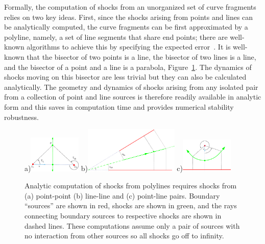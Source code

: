 Formally, the computation of shocks from an unorganized set of curve fragments relies on two key ideas. First, since the shocks arising from points and lines can be analytically computed, the curve fragments can be first approximated by a polyline, namely, a set of line segments that share end points; there are well-known algorithms to achieve this by specifying the expected error~\cite{vxl:webcite}. It is well-known that the bisector of two points is a line, the bisector of two lines is a line, and the bisector of a point and a line is a parabola, Figure~\ref{fig:bisect}. The dynamics of shocks moving on this bisector are less trivial but they can also be calculated analytically. The geometry and dynamics of shocks arising from any isolated pair from a collection of point and line sources is therefore readily available in analytic form and this saves in computation time and provides numerical stability robustness. 

\begin{figure}[ht]
\center
a)\includegraphics[width=0.221\textwidth]{figs/point-point-fixed.pdf}
b)\includegraphics[width=0.4\textwidth]{figs/line-line-fixed.pdf}
c)\includegraphics[width=0.221\textwidth]{figs/point-line-fixed.pdf}

\caption{Analytic computation of shocks from polylines requires shocks from (a) point-point (b) line-line and (c) point-line pairs. Boundary “sources” are shown in red, shocks are shown in green, and the rays connecting boundary sources to respective shocks are shown in dashed lines. These computations assume only a pair of sources with no interaction from other sources so all shocks go off to infinity.  } 
\label{fig:bisect}
\end{figure}

